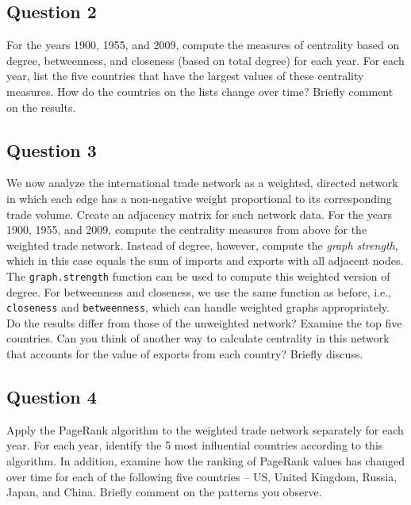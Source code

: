 \documentclass[]{article}
\begin{document}
\subsection{Question 2}\label{question-2}

For the years 1900, 1955, and 2009, compute the measures of centrality
based on degree, betweenness, and closeness (based on total degree) for
each year. For each year, list the five countries that have the largest
values of these centrality measures. How do the countries on the lists
change over time? Briefly comment on the results.

\subsection{Question 3}\label{question-3}

We now analyze the international trade network as a weighted, directed
network in which each edge has a non-negative weight proportional to its
corresponding trade volume. Create an adjacency matrix for such network
data. For the years 1900, 1955, and 2009, compute the centrality
measures from above for the weighted trade network. Instead of degree,
however, compute the \emph{graph strength}, which in this case equals
the sum of imports and exports with all adjacent nodes. The
\texttt{graph.strength} function can be used to compute this weighted
version of degree. For betweenness and closeness, we use the same
function as before, i.e., \texttt{closeness} and \texttt{betweenness},
which can handle weighted graphs appropriately. Do the results differ
from those of the unweighted network? Examine the top five countries.
Can you think of another way to calculate centrality in this network
that accounts for the value of exports from each country? Briefly
discuss.

\subsection{Question 4}\label{question-4}

Apply the PageRank algorithm to the weighted trade network separately
for each year. For each year, identify the 5 most influential countries
according to this algorithm. In addition, examine how the ranking of
PageRank values has changed over time for each of the following five
countries -- US, United Kingdom, Russia, Japan, and China. Briefly
comment on the patterns you observe.
\end{document}
